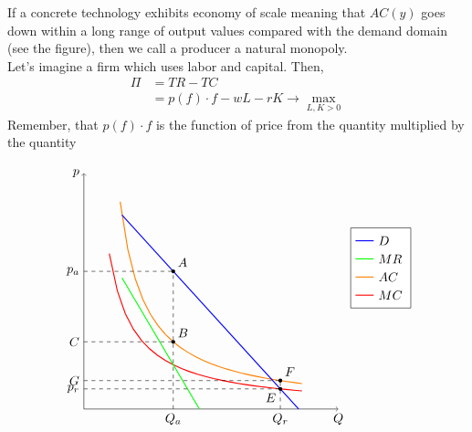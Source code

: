 \documentclass[a4paper, 10pt]{article}
\begin{document}
\begin{minipage}{0.5\textwidth}
    If a concrete technology exhibits economy of scale meaning that $A C(y)$ goes down within a long range of output values compared with the demand domain (see the figure), then we call a producer a natural monopoly.\\[2mm]

    Let's imagine a firm which uses labor and capital. Then,
    $$
    \begin{aligned}
        \Pi&=TR-TC\\
        &=p(f)\cdot f - wL-rK\longrightarrow\max\limits_{L,K>0}
    \end{aligned}
    $$
    Remember, that $p(f)\cdot f$ is the function of price from the quantity multiplied by the quantity
\end{minipage}
\begin{minipage}{0.5\textwidth}
    $$
\begin{tikzpicture}
    \draw[->] (0,0) -- (7,0) node[below] {$Q$};
    \draw[->] (0,0) -- (0,6.5) node[left] {$p$};

    \draw[red, thick, domain=0.7:6] plot (\x, {3/\x}) node[right] {};

    \draw[orange, thick, domain=1:6] plot (\x, {4/(\x-0.3)}) node[right] {};

    \draw[blue, thick] (5.90909, 0) -- (1.04807, 5.34713);
    \draw[green, thick] (1.05, 3.615) -- (3.17647, 0);

    \draw[dashed] (2.45874,0) node[below] {$Q_a$} -- (2.45874,3.79539);
    \draw[dashed] (5.40445,0) node[below] {$Q_r$} -- (5.40445,0.78363);
    \draw[dashed] (0,0.78363) node[left] {$G$} -- (5.40445,0.78363);
    \draw[dashed] (0,3.79539) node[left] {$p_a$} -- (2.45874,3.79539);
    \draw[dashed] (0,0.55511) node[left] {$p_r$} -- (5.40445,0.55511);
    \draw[dashed] (0,1.85293) node[left] {$C$} -- (2.45874,1.85293);


    \fill[teal, black] (2.45874,3.79539) node[black, above right] {$A$} circle (1.5pt);
    \fill[teal, black] (2.45874,1.85293) node[black, above right] {$B$} circle (1.5pt);
    \fill[teal, black] (5.40445,0.78363) node[black, above right] {$F$} circle (1.5pt);
    \fill[teal, black] (5.40445,0.55511) node[black, below left] {$E$} circle (1.5pt);

    \node[draw, anchor=north east,fill=white] at (9,5) {
    \begin{tikzpicture}
        \draw[blue, thick] (0,0) -- (0.5,0) node[right, text=black] {\(D\)};
        \draw[green, thick] (0,-0.5) -- (0.5,-0.5) node[right, text=black] {\(MR\)};
        \draw[orange, thick] (0,-1) -- (0.5,-1) node[right, text=black] {\(AC\)};
        \draw[red, thick] (0,-1.5) -- (0.5,-1.5) node[right, text=black] {\(MC\)};
    \end{tikzpicture}
    };
\end{tikzpicture}
$$
\end{minipage}
\end{document}
